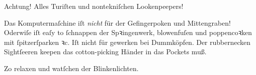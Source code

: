 \documentclass[preview]{standalone}
\begin{document}
\centering
{\Huge {\selectfont A}}{\Large chtung!}
{\Large Alles Turiſten und nontekniſchen Lookenpeepers!}

\vspace{2mm}
Das Komputermaſchine iſt \emph{nicht} für der Gefingerpoken und Mittengraben!
Oderwiſe iſt eaſy to ſchnappen der Spꝛingenwerk, blowenfuſen und poppencoꝛken
mit ſpitzerſparken ꝛc.
Iſt nicht für gewerken bei Dummköpfen.
Der rubbernecken Sightſeeren keepen das
{\selectfont cotton-picking}
Händer in das
{ Pockets}
muß.

\vspace{1mm}

\centering
Zo relaxen und watſchen der Blinkenlichten.
\end{document}
